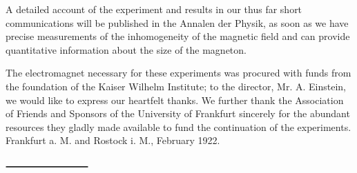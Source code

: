 \documentclass[11pt]{article}
\begin{document}
A detailed account of the experiment and results in our thus far short communications will be published in the Annalen der Physik, as soon as we have precise measurements of the inhomogeneity of the magnetic field and can provide quantitative information about the size of the magneton.

The electromagnet necessary for these experiments was procured with funds from the foundation of the Kaiser Wilhelm Institute; to the director, Mr. A. Einstein, we would like to express our heartfelt thanks. We further thank the Association of Friends and Sponsors of the University of Frankfurt sincerely for the abundant resources they gladly made available to fund the continuation of the experiments.\\[2pt]


Frankfurt a. M. and Rostock i. M., February 1922.


   \begin{center}
   $\rule{3cm}{0.04cm}$
     \end{center}
\end{document}
